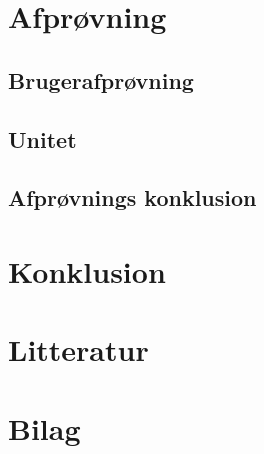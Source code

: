\documentclass[final]{rapport1}
\begin{document}
\chapter{Afprøvning}

\section{Brugerafprøvning}

\section{Unitet}

\section{Afprøvnings konklusion}


\chapter{Konklusion}

\chapter{Litteratur}

\chapter{Bilag}
\end{document}
